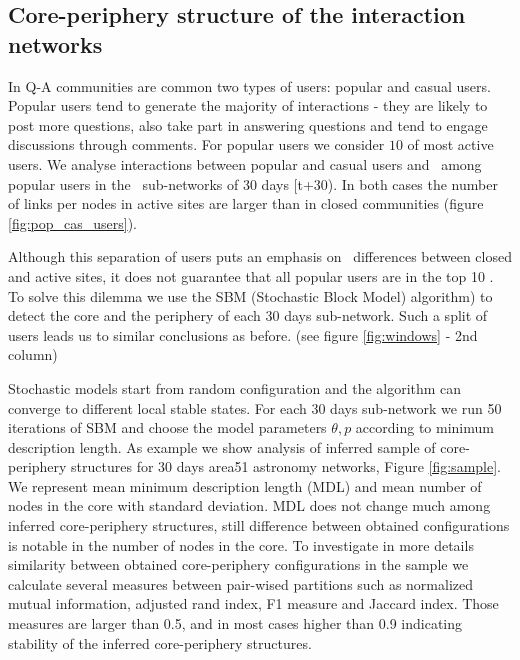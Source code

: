 \subsection{Core-periphery structure of the interaction networks}


In Q-A communities are common two types of users: popular and casual users. Popular users tend to generate the majority of interactions - they are likely to post more questions, also take part in answering questions and tend to engage discussions through comments. For popular users we consider $10 $  of most active users. We analyse interactions between popular and casual users and  among popular users in the  sub-networks of 30 days [t+30). In both cases the number of links per nodes in active sites are larger than in closed communities (figure \ref{fig:pop_cas_users}).

Although this separation of users puts an emphasis on  differences between closed and active sites, it does not guarantee that all popular users are in the top 10 . To solve this dilemma we use the SBM (Stochastic Block Model) algorithm) to detect the core and the periphery of each 30 days sub-network. Such a split of users leads us to similar conclusions as before. (see figure \ref{fig:windows} - 2nd column)

Stochastic models start from random configuration and the algorithm  can converge to different local stable states. For each 30 days sub-network we run 50 iterations of SBM and choose the model parameters $\theta, p$ according to minimum description length. As example we show analysis of inferred sample of  core-periphery structures for 30 days area51 astronomy networks, Figure \ref{fig:sample}. We represent mean minimum description length (MDL) and mean number of nodes in the core with standard deviation. MDL does not change much among inferred core-periphery structures, still difference between obtained configurations is notable in the number of nodes in the core.  To investigate in more details similarity between obtained core-periphery configurations in the sample we calculate several measures between pair-wised partitions such as normalized mutual information, adjusted rand index, F1 measure and Jaccard index. Those measures are larger than 0.5, and in most cases higher than 0.9 indicating stability of the inferred core-periphery structures.



